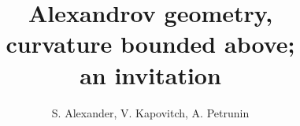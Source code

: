\documentclass[twoside]{book}
\begin{document}
\frontmatter
\title{Alexandrov geometry,\\  
curvature bounded above;\\ 
an invitation}
\author{S. Alexander, V. Kapovitch, A. Petrunin}
\maketitle
\mainmatter









\end{document}

